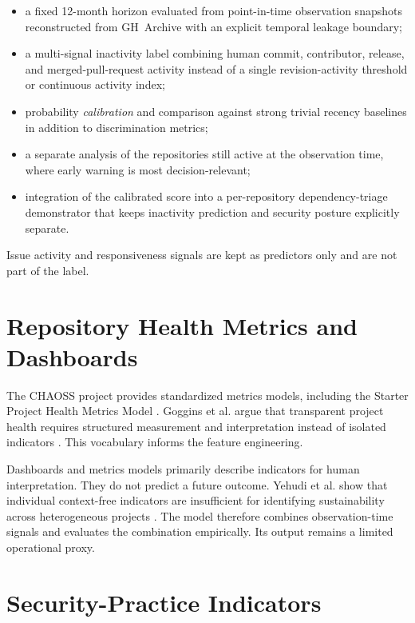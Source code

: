 \begin{itemize}
    \item a fixed 12-month horizon evaluated from point-in-time observation snapshots reconstructed from GH~Archive with an explicit temporal leakage boundary;
    \item a multi-signal inactivity label combining human commit, contributor, release, and merged-pull-request activity instead of a single revision-activity threshold or continuous activity index;
    \item probability \emph{calibration} and comparison against strong trivial recency baselines in addition to discrimination metrics;
    \item a separate analysis of the repositories still active at the observation time, where early warning is most decision-relevant;
    \item integration of the calibrated score into a per-repository dependency-triage demonstrator that keeps inactivity prediction and security posture explicitly separate.
\end{itemize}

Issue activity and responsiveness signals are kept as predictors only and are not part of the label.

\section{Repository Health Metrics and Dashboards}
\label{sec:related-health-metrics}

The CHAOSS project provides standardized metrics models, including the Starter
Project Health Metrics Model \cite{chaossStarterProjectHealth}. Goggins et al.
argue that transparent project health requires structured measurement and
interpretation instead of isolated indicators \cite{goggins2021transparent}.
This vocabulary informs the feature engineering.

Dashboards and metrics models primarily describe indicators for human
interpretation. They do not predict a future outcome. Yehudi et al. show that
individual context-free indicators are insufficient for identifying
sustainability across heterogeneous projects \cite{yehudi2023contextfree}. The
model therefore combines observation-time signals and evaluates the combination
empirically. Its output remains a limited operational proxy.

\section{Security-Practice Indicators}
\label{sec:related-security-practice}

